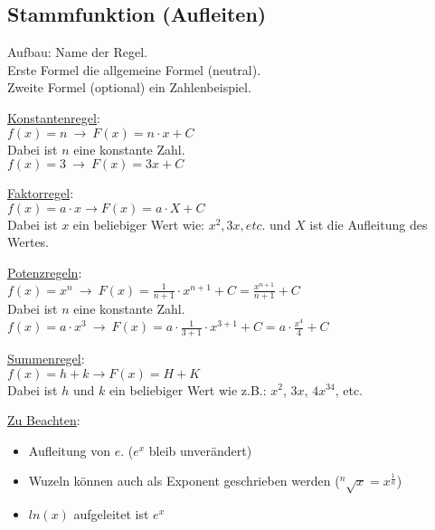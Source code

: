\subsection{Stammfunktion (Aufleiten)}
\label{sec:aufleitungs_regeln}

Aufbau: Name der Regel. \\
Erste Formel die allgemeine Formel (neutral). \\
Zweite Formel (optional) ein Zahlenbeispiel. 
\par
\underline{Konstantenregel}: \\
$f(x) = n\ \rightarrow\ F(x) = n\cdot x + C$ \\
Dabei ist $n$ eine konstante Zahl. \\
$f(x) = 3\ \rightarrow\ F(x) = 3x + C$ 
\par
\underline{Faktorregel}: \\
$f(x) = a\cdot x \rightarrow F(x) = a\cdot X + C$ \\
Dabei ist $x$ ein beliebiger Wert wie: $x^2, 3x, etc.$ und $X$ ist die Aufleitung des Wertes. 
\par
\underline{Potenzregeln}: \\
$f(x) = x^n\ \rightarrow\ F(x) = \frac{1}{n + 1}\cdot x^{n + 1} + C = \frac{x^{n+1}}{n+1} + C$\\
Dabei ist $n$ eine konstante Zahl. \\
$f(x) = a\cdot x^3\ \rightarrow\ F(x) = a\cdot \frac{1}{3 + 1}\cdot x^{3 + 1} + C= a\cdot \frac{x^{4}}{4} + C$ 
\par
\underline{Summenregel}: \\
$f(x) = h + k \rightarrow F(x) = H + K$ \\
Dabei ist $h$ und $k$ ein beliebiger Wert wie z.B.: $x^2$, $3x$, $4x^34$, etc. 
\par
\underline{Zu Beachten}:
\begin{itemize}
    \item Aufleitung von $e$. ($e^x$ bleib unverändert)
    \item Wuzeln können auch als Exponent geschrieben werden ($^n\sqrt{x} = x^{\frac{1}{n}}$)
    \item $ln(x)$ aufgeleitet ist $e^x$
\end{itemize}
